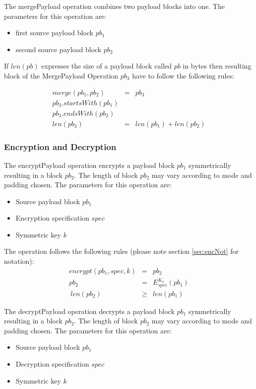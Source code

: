 \documentclass[10pt,journal,compsoc]{IEEEtran}
\begin{document}
The mergePayload operation combines two payload blocks into one. The parameters for this operation are:

\begin{itemize}
	\item first source payload block $pb_1$
	\item second source payload block $pb_2$
\end{itemize}

If $len(pb)$ expresses the size of a payload block called $pb$ in bytes then resulting block of the MergePayload Operation $pb_3$ have to follow the following rules:

\begin{eqnarray}
merge(pb_1, pb_2) & = & pb_3 \\
pb_3.startsWith(pb_1)\\
pb_3.endsWith(pb_2)\\
len(pb_3) & = & len(pb_1) + len(pb_2)
\end{eqnarray}

\subsubsection{Encryption and Decryption}
The encryptPayload operation encrypts a payload block $pb_1$ symmetrically resulting in a block $pb_2$. The length of block $pb_2$ may vary according to mode and padding chosen. The parameters for this operation are:

\begin{itemize}
	\item Source payload block $pb_1$
	\item Encryption specification $spec$
	\item Symmetric key $k$
\end{itemize}

The operation follows the following rules (please note section \ref{sec:encNot} for notation):
\begin{eqnarray}
encrypt(pb_1, spec, k) & = & pb_2 \\
pb_2 & = & E_{spec}^{K_a}\left( pb_1 \right)\\\
len(pb_2) & \geq & len(pb_1)
\end{eqnarray}


The decryptPayload operation decrypts a payload block $pb_1$ symmetrically resulting in a block $pb_2$. The length of block $pb_2$ may vary according to mode and padding chosen. The parameters for this operation are:

\begin{itemize}
	\item Source payload block $pb_1$
	\item Decryption specification $spec$
	\item Symmetric key $k$
\end{itemize}
\end{document}
